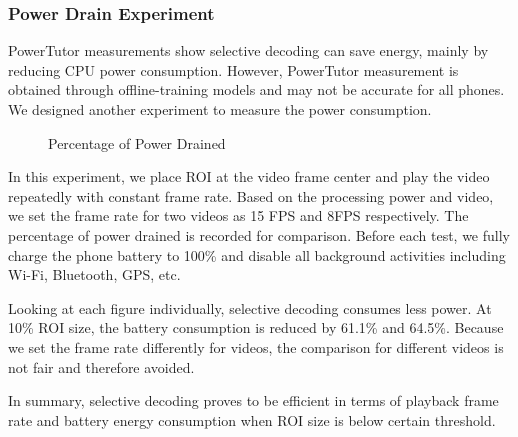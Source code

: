 \subsubsection{Power Drain Experiment}
PowerTutor measurements show selective decoding can save energy, mainly by reducing CPU power consumption. However, PowerTutor measurement is obtained through offline-training models\cite{Zhang:2010:AOP:1878961.1878982} and may not be accurate for all phones. We designed another experiment to measure the power consumption. 

\begin{figure}
\centering
\caption{Percentage of Power Drained}
\end{figure}
In this experiment, we place ROI at the video frame center and play the video repeatedly with constant frame rate. Based on the processing power and video, we set the frame rate for two videos as 15 FPS and 8FPS respectively. The percentage of power drained is recorded for comparison. Before each test, we fully charge the phone battery to 100\% and disable all background activities including Wi-Fi, Bluetooth, GPS, etc.

Looking at each figure individually, selective decoding consumes less power. At 10\% ROI size, the battery consumption is reduced by 61.1\% and 64.5\%. Because we set the frame rate differently for videos, the comparison for different videos is not fair and therefore avoided.  

In summary, selective decoding proves to be efficient in terms of playback frame rate and battery energy consumption when ROI size is below certain threshold.  




